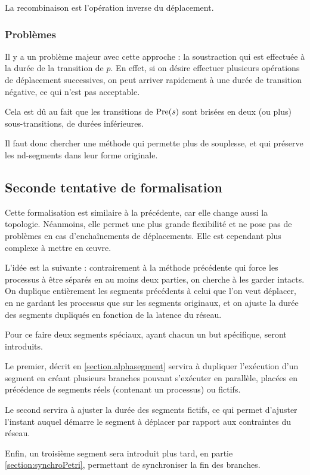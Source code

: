 La recombinaison est l'opération inverse du déplacement.

\subsubsection{Problèmes}
Il y a un problème majeur avec cette approche : la soustraction qui est effectuée à la durée de la transition de $p$. En effet, si on désire effectuer plusieurs opérations de déplacement successives, on peut arriver rapidement à une durée de transition négative, ce qui n'est pas acceptable. 

Cela est dû au fait que les transitions de $\operatorname{Pre}(s)$ sont brisées en deux (ou plus) sous-transitions, de durées inférieures.

Il faut donc chercher une méthode qui permette plus de souplesse, et qui préserve les nd-segments dans leur forme originale.

\subsection{Seconde tentative de formalisation}
Cette formalisation est similaire à la précédente, car elle change aussi la topologie. Néanmoins, elle permet une plus grande flexibilité et ne pose pas de problèmes en cas d'enchaînements de déplacements.
Elle est cependant plus complexe à mettre en œuvre.

L'idée est la suivante : contrairement à la méthode précédente qui force les processus à être séparés en au moins deux parties, on cherche à les garder intacts. On duplique entièrement les segments précédents à celui que l'on veut déplacer, en ne gardant les processus que sur les segments originaux, et on ajuste la durée des segments dupliqués en fonction de la latence du réseau.

Pour ce faire deux segments spéciaux, ayant chacun un but spécifique, seront introduits.

Le premier, décrit en \cref{section.alphasegment} servira à dupliquer l'exécution d'un segment en créant plusieurs branches pouvant s'exécuter en parallèle, placées en précédence de segments réels (contenant un processus) ou fictifs.

Le second servira à ajuster la durée des segments fictifs, ce qui permet d'ajuster l'instant auquel démarre le segment à déplacer par rapport aux contraintes du réseau.

Enfin, un troisième segment sera introduit plus tard, en partie \ref{section:synchroPetri}, permettant de synchroniser la fin des branches.

